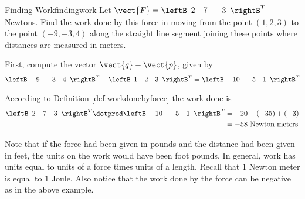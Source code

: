 \begin{example}{Finding Work}{findingwork}
Let $\vect{F}=
\leftB
\begin{array}{rrr}
2 & 7 & -3
\end{array}
\rightB^T$ Newtons. Find the work
done by this force in moving from the point $\left( 1,2,3\right) $ to the
point $\left( -9,-3,4\right) $ along the straight line segment joining these
points where distances are measured in meters.
\end{example}

\begin{solution}
First, compute the vector $\vect{q} - \vect{p}$, given by 
\begin{equation*}
\leftB
\begin{array}{rrr}
-9 & -3 & 4
\end{array}
\rightB^T
-
\leftB
\begin{array}{rrr}
1 & 2 & 3
\end{array}
\rightB^T
=
\leftB
\begin{array}{rrr}
-10 & -5 & 1
\end{array}
\rightB^T
\end{equation*}

According to Definition \ref{def:workdonebyforce} the work done is
\begin{align*}
\leftB
\begin{array}{rrr}
2 & 7 & 3
\end{array}
\rightB^T
 \dotprod 
\leftB
\begin{array}{rrr}
-10 & -5 & 1
\end{array}
\rightB^T
& =-20+\left( -35\right) +\left(
-3\right) \\
& =-58\text{ Newton meters}
\end{align*}
\end{solution}

Note that if the force had been given in pounds and the distance had been
given in feet, the units on the work would have been foot pounds. In
general, work has units equal to units of a force times units of a length.
Recall that $1$ Newton meter is equal to $1$ Joule.  Also notice that the work done by the force can be negative as in the
above example.